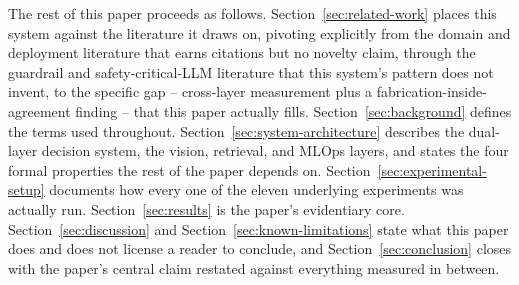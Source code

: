 



The rest of this paper proceeds as follows. Section~\ref{sec:related-work} places this system
against the literature it draws on, pivoting explicitly from the domain and deployment literature
that earns citations but no novelty claim, through the guardrail and safety-critical-LLM literature
that this system's pattern does not invent, to the specific gap -- cross-layer measurement plus a
fabrication-inside-agreement finding -- that this paper actually fills.
Section~\ref{sec:background} defines the terms used throughout. Section~\ref{sec:system-architecture}
describes the dual-layer decision system, the vision, retrieval, and MLOps layers, and states the
four formal properties the rest of the paper depends on.
Section~\ref{sec:experimental-setup} documents how every one of the eleven underlying experiments
was actually run. Section~\ref{sec:results} is the paper's evidentiary core.
Section~\ref{sec:discussion} and Section~\ref{sec:known-limitations} state what this paper does and
does not license a reader to conclude, and Section~\ref{sec:conclusion} closes with the paper's
central claim restated against everything measured in between.
